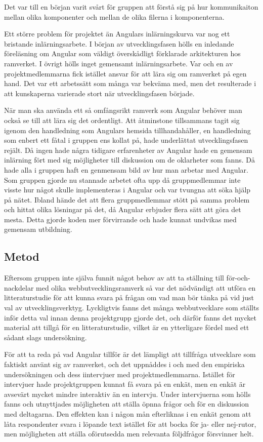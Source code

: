 Det var till en början varit svårt för gruppen att förstå sig på hur kommunikaiton mellan olika komponenter och mellan de olika filerna i komponenterna. 

Ett större problem för projektet än Angulars inlärningskurva var nog ett bristande inlärningsarbete. I början av utvecklingsfasen hölls en inledande föreläsning om Angular som väldigt överskådligt förklarade arkitekturen hos ramverket. I övrigt hölls inget gemensamt inlärningsarbete. Var och en av projektmedlemmarna fick istället ansvar för att lära sig om ramverket på egen hand. Det var ett arbetssätt som många var bekväma med, men det resulterade i att kunskaperna varierade stort när utvecklingsfasen började. 

När man ska använda ett så omfångsrikt ramverk som Angular behöver man också se till att lära sig det ordentligt. Att åtminstone tillsammans tagit sig igenom den handledning som Angulars hemsida tillhandahåller, en handledning som enbert ett fåtal i gruppen ens kollat på, hade underlättat utvecklingsfasen rejält. Då ingen hade några tidigare erfarenheter av Angular hade en gemensam inlärning fört med sig möjligheter till diskussion om de oklarheter som fanns. Då hade alla i gruppen haft en genmensam bild av hur man arbetar med Angular. Som gruppen gjorde nu stannade arbetet ofta upp då gruppmedlemmar inte visste hur något skulle implementeras i Angular och var tvungna att söka hjälp på nätet. Ibland hände det att flera gruppmedlemmar stött på samma problem och hittat olika lösningar på det, då Angular erbjuder flera sätt att göra det mesta. Detta gjorde koden mer förvirrande och hade kunnat undvikas med gemensam utbildning.     

     


\subsection{Metod}

Eftersom gruppen inte själva funnit något behov av att ta ställning till för-och-nackdelar med olika webbutvecklingsramverk så var det nödvändigt att utföra en litteraturstudie för att kunna svara på frågan om vad man bör tänka på vid just val av utvecklingsverktyg. Lyckligtvis fanns det många webbutvecklare som ställts inför detta val innan denna projektgrupp gjorde det, och därför fanns det mycket material att tillgå för en litteraturstudie, vilket är en ytterligare fördel med ett sådant slags undersökning.

För att ta reda på vad Angular tillför är det lämpligt att tillfråga utvecklare som faktiskt använt sig av ramverket, och det uppnåddes i och med den empiriska undersökningen och dess iintervjuer med projektmedlemmarna. Istället för intervjuer hade projektgruppen kunnat få svara på en enkät, men en enkät är avsevärt mycket mindre interaktiv än en intervju. Under intervjuerna som hölls fanns och utnyttjades möjligheten att ställa öpnna frågor och för en diskussion med deltagarna. Den effekten kan i någon mån efterliknas i en enkät genom att låta respondenter svara i löpande text istället för att bocka för ja- eller nej-rutor, men möjligheten att ställa oförutsedda men relevanta följdfrågor försvinner helt. 

